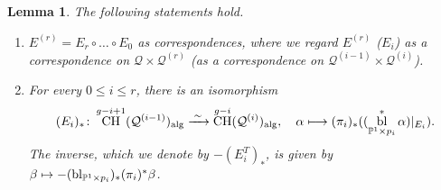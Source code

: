 \documentclass[JEP,XML,SOM,Unicode,NoEqCountersInSection,published]{cedram}
\newcommand\mto{\mathchoice{\longmapsto}{\mapsto}{\mapsto}{\mapsto}}
\theoremstyle{plain}
\newtheorem{lem}[thm]{Lemma}
\theoremstyle{definition}
\DeclareMathOperator{\alg}{alg}
\DeclareMathOperator{\bl}{bl}
\DeclareMathOperator{\CH}{CH}
\renewcommand\P{\mathbb{P}}
\begin{document}
\begin{lem}\label{lem:chow-onestep-reduction}
The following statements hold.
\begin{enumerate}
\item\label{item:chow-onestep-reduction-exc-corresp} $E^{(r)}=E_r\circ\dots \circ E_0$ as correspondences, where we regard $E^{(r)}$ (\resp $E_i$) as a correspondence on $\mathcal{Q}\times \mathcal{Q}^{(r)}$ (\resp as a correspondence on $\mathcal{Q}^{(i-1)}\times \mathcal{Q}^{(i)}$).
\item\label{item:chow-onestep-reduction-CHQ}
For every $0 \leq i \leq r$, there is an isomorphism
\[
(E_i)_*\colon \CH^{g-i+1}(\mathcal{Q}^{(i-1)})_{\alg}\xrightarrow{\;\sim\;}\CH^{g-i}(\mathcal{Q}^{(i)})_{\alg}, \quad \alpha \mto (\pi_i)_*((\bl_{\P^1\times p_i}^*\alpha)|_{E_i}).
\]
The inverse, which we denote by $-(E_i^T)_*$, is given by
$\beta \mto -(\bl_{\P^1\times p_i})_*(\pi_i)^*\beta$.
\end{enumerate}
\end{lem}
\end{document}
